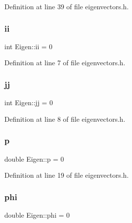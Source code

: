 Definition at line 39 of file eigenvectors.\+h.

\mbox{\label{classEigen_a4b673cadea3826951103971373749755}} 
\subsubsection{\texorpdfstring{ii}{ii}}
{\footnotesize\ttfamily int Eigen\+::ii = 0\hspace{0.3cm}{\ttfamily [private]}}



Definition at line 7 of file eigenvectors.\+h.

\mbox{\label{classEigen_a6c01ba28c8638ee116d595e466a8bd6d}} 
\subsubsection{\texorpdfstring{jj}{jj}}
{\footnotesize\ttfamily int Eigen\+::jj = 0\hspace{0.3cm}{\ttfamily [private]}}



Definition at line 8 of file eigenvectors.\+h.

\mbox{\label{classEigen_a06929fb8d011df1c58fde1486e54a7a1}} 
\subsubsection{\texorpdfstring{p}{p}}
{\footnotesize\ttfamily double Eigen\+::p = 0\hspace{0.3cm}{\ttfamily [private]}}



Definition at line 19 of file eigenvectors.\+h.

\mbox{\label{classEigen_a205ed994f4da55a9663a1cf8ddac34fa}} 
\subsubsection{\texorpdfstring{phi}{phi}}
{\footnotesize\ttfamily double Eigen\+::phi = 0\hspace{0.3cm}{\ttfamily [private]}}



